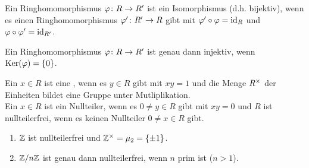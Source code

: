 \begin{satz}
	Ein Ringhomomorphismus $\varphi \colon R \to R'$ ist ein Isomorphismus (d.h. bijektiv), wenn es einen Ringhomomorphismus $\varphi' \colon R' \to R$ gibt mit $\varphi' \circ \varphi = \operatorname{id}_R$ und $\varphi \circ \varphi' = \operatorname{id}_{R'}$.
\end{satz}

\begin{satz}
	Ein Ringhomomorphismus $\varphi \colon R \to R'$ ist genau dann injektiv, wenn $\operatorname{Ker}(\varphi) = \{ 0 \}$.
\end{satz}

\begin{defin}
	Ein $x \in R$ ist eine , wenn es $y \in R$ gibt mit $xy = 1$ und die Menge ${R}^{\times}$ der Einheiten bildet eine Gruppe unter Mutliplikation. \\
	Ein $x \in R$ ist ein Nullteiler, wenn es $0 \neq y \in R$ gibt mit $xy = 0$ und $R$ ist nullteilerfrei, wenn es keinen Nullteiler $0 \neq x \in R$ gibt.
\end{defin}

\begin{bsp}
	\begin{enumerate}
		\item $\mathbb{Z}$ ist nullteilerfrei und $ {\mathbb{Z}}^{\times}= \mu_2 = \{ \pm 1 \}$.
		\item $\mathbb{Z} / n \mathbb{Z}$ ist genau dann nullteilerfrei, wenn $n$ prim ist ($n > 1$).
	\end{enumerate}
\end{bsp}
